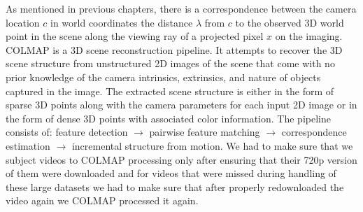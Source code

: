 






As mentioned in previous chapters, there is a correspondence between the camera location $c$ in world coordinates the distance $\lambda$ from $c$ to the observed 3D world point in the scene along the viewing ray of a projected pixel $x$ on the imaging. COLMAP is a 3D scene reconstruction pipeline. It attempts to recover the 3D scene structure from unstructured 2D images of the scene that come with no prior knowledge of the camera intrinsics, extrinsics, and nature of objects captured in the image. The extracted scene structure is either in the form of sparse 3D points along with the camera parameters for each input 2D image or in the form of dense 3D points with associated color information. The pipeline consists of: feature detection $\rightarrow$ pairwise feature matching  $\rightarrow$ correspondence estimation $\rightarrow$ incremental structure from motion. We had to make sure that we subject videos to COLMAP processing only after ensuring that their 720p version of them were downloaded and for videos that were missed during handling of these large datasets we had to make sure that after properly redownloaded the video again we COLMAP processed it again.



